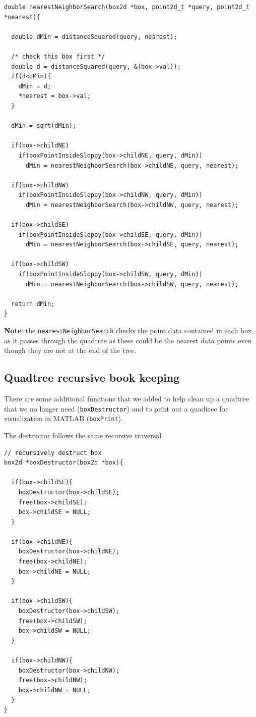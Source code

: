 \begin{verbatim}
double nearestNeighborSearch(box2d *box, point2d_t *query, point2d_t *nearest){

  double dMin = distanceSquared(query, nearest);
  
  /* check this box first */
  double d = distanceSquared(query, &(box->val));
  if(d<dMin){
    dMin = d;
    *nearest = box->val;
  }

  dMin = sqrt(dMin);

  if(box->childNE)
    if(boxPointInsideSloppy(box->childNE, query, dMin))
      dMin = nearestNeighborSearch(box->childNE, query, nearest);

  if(box->childNW)
    if(boxPointInsideSloppy(box->childNW, query, dMin))
      dMin = nearestNeighborSearch(box->childNW, query, nearest);

  if(box->childSE)
    if(boxPointInsideSloppy(box->childSE, query, dMin))
      dMin = nearestNeighborSearch(box->childSE, query, nearest);

  if(box->childSW)
    if(boxPointInsideSloppy(box->childSW, query, dMin))
      dMin = nearestNeighborSearch(box->childSW, query, nearest);

  return dMin;
}
\end{verbatim}

{\bf Note}: the \texttt{nearestNeighborSearch} checks the point data contained in each box as it passes through the quadtree as these could be the nearest data points even though they are not at the end of the tree.

\subsection{Quadtree recursive book keeping}

There are some additional functions that we added to help clean up a quadtree that we no longer need (\texttt{boxDestructor}) and to print out a quadtree for visualization in MATLAB (\texttt{boxPrint}).

The destructor follows the same recursive traversal

\begin{verbatim}
// recursively destruct box         
box2d *boxDestructor(box2d *box){

  if(box->childSE){
    boxDestructor(box->childSE);
    free(box->childSE);
    box->childSE = NULL;
  }

  if(box->childNE){
    boxDestructor(box->childNE);
    free(box->childNE);
    box->childNE = NULL;
  }

  if(box->childSW){
    boxDestructor(box->childSW);
    free(box->childSW);
    box->childSW = NULL;
  }

  if(box->childNW){
    boxDestructor(box->childNW);
    free(box->childNW);
    box->childNW = NULL;
  }
}
\end{verbatim}

